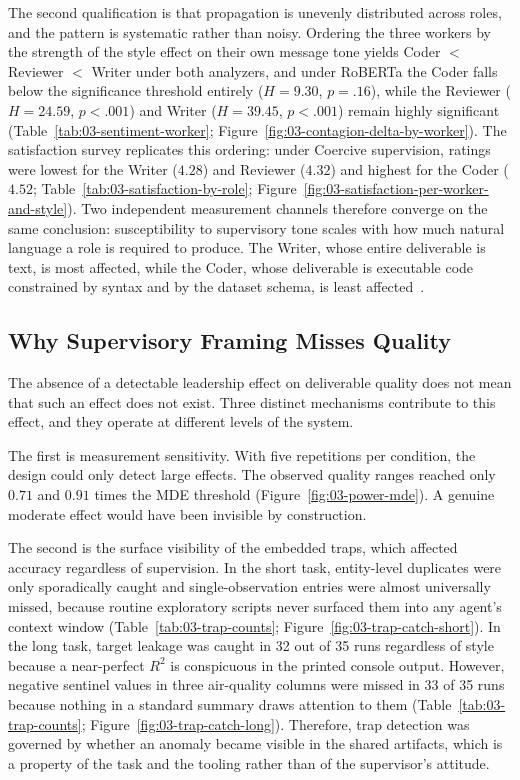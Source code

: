 The second qualification is that propagation is unevenly distributed across roles, and the pattern is systematic rather than noisy.
Ordering the three workers by the strength of the style effect on their own message tone yields Coder $<$ Reviewer $<$ Writer under both analyzers, and under \ac{RoBERTa} the Coder falls below the significance threshold entirely ($H = 9.30$, $p = .16$), while the Reviewer ($H = 24.59$, $p < .001$) and Writer ($H = 39.45$, $p < .001$) remain highly significant (Table~\ref{tab:03-sentiment-worker}; Figure~\ref{fig:03-contagion-delta-by-worker}).
The satisfaction survey replicates this ordering: under Coercive supervision, ratings were lowest for the Writer ($4.28$) and Reviewer ($4.32$) and highest for the Coder ($4.52$; Table~\ref{tab:03-satisfaction-by-role}; Figure~\ref{fig:03-satisfaction-per-worker-and-style}).
Two independent measurement channels therefore converge on the same conclusion:
susceptibility to supervisory tone scales with how much natural language a role is required to produce.
The Writer, whose entire deliverable is text, is most affected, while the Coder, whose deliverable is executable code constrained by syntax and by the dataset schema, is least affected~\cite{qian2024chatdevcommunicativeagentssoftware}.

\subsection{Why Supervisory Framing Misses Quality}
\label{subsec:why-quality-unaffected}

The absence of a detectable leadership effect on deliverable quality does not mean that such an effect does not exist.
Three distinct mechanisms contribute to this effect, and they operate at different levels of the system.

The first is measurement sensitivity.
With five repetitions per condition, the design could only detect large effects. 
The observed quality ranges reached only $0.71$ and $0.91$ times the \ac{MDE} threshold (Figure~\ref{fig:03-power-mde}).
A genuine moderate effect would have been invisible by construction.

The second is the surface visibility of the embedded traps, which affected accuracy regardless of supervision.
In the short task, entity-level duplicates were only sporadically caught and single-observation entries were almost universally missed, because routine exploratory scripts never surfaced them into any agent's context window (Table~\ref{tab:03-trap-counts}; Figure~\ref{fig:03-trap-catch-short}).
In the long task, target leakage was caught in 32 out of 35 runs regardless of style because a near-perfect $R^2$ is conspicuous in the printed console output.
However, negative sentinel values in three air-quality columns were missed in 33 of 35 runs because nothing in a standard summary draws attention to them (Table~\ref{tab:03-trap-counts}; Figure~\ref{fig:03-trap-catch-long}).
Therefore, trap detection was governed by whether an anomaly became visible in the shared artifacts, which is a property of the task and the tooling rather than of the supervisor's attitude.

